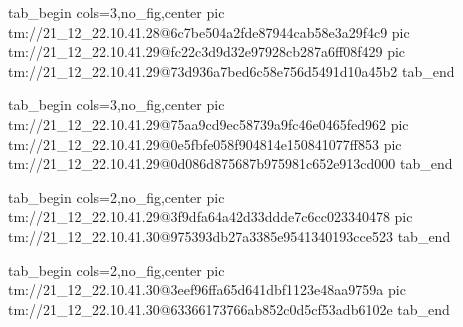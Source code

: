 \ifcmt
  tab_begin cols=3,no_fig,center
    pic tm://21_12_22.10.41.28@6c7be504a2fde87944cab58e3a29f4c9
    pic tm://21_12_22.10.41.29@fc22c3d9d32e97928cb287a6ff08f429
    pic tm://21_12_22.10.41.29@73d936a7bed6c58e756d5491d10a45b2
  tab_end
\fi


\ifcmt
  tab_begin cols=3,no_fig,center
    pic tm://21_12_22.10.41.29@75aa9cd9ec58739a9fc46e0465fed962
    pic tm://21_12_22.10.41.29@0e5fbfe058f904814e150841077ff853
    pic tm://21_12_22.10.41.29@0d086d875687b975981c652e913cd000
  tab_end
\fi


\ifcmt
  tab_begin cols=2,no_fig,center
    pic tm://21_12_22.10.41.29@3f9dfa64a42d33ddde7c6cc023340478
    pic tm://21_12_22.10.41.30@975393db27a3385e9541340193cce523
  tab_end
\fi


\ifcmt
  tab_begin cols=2,no_fig,center
    pic tm://21_12_22.10.41.30@3eef96ffa65d641dbf1123e48aa9759a
    pic tm://21_12_22.10.41.30@63366173766ab852c0d5cf53adb6102e
  tab_end
\fi

